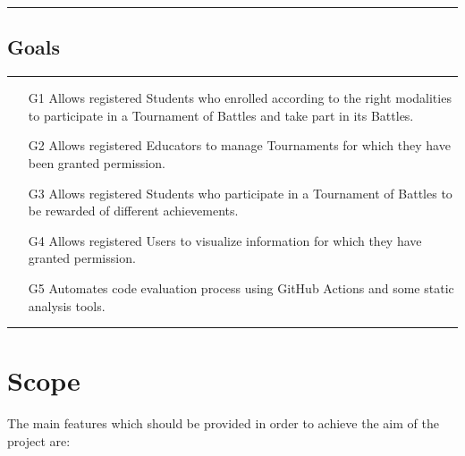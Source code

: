 \documentclass{Configuration_Files/Template}
\begin{document}
{\color{bluepoli}\rule{\linewidth}{0.1pt}}

\subsection{Goals}

{\color{bluepoli}\rule{\linewidth}{0.1pt}}

\begin{enumerate}
    \item[\textcolor{bluepoli}{G1}] Allows registered Students who enrolled according to the right modalities to participate in a Tournament of Battles and take part in its Battles.
    \item[\textcolor{bluepoli}{G2}] Allows registered Educators to manage Tournaments for which they have been granted permission.
    \item[\textcolor{bluepoli}{G3}] Allows registered Students who participate in a Tournament of Battles to be rewarded of different achievements.
    \item[\textcolor{bluepoli}{G4}] Allows registered Users to visualize information for which they have granted permission.
    \item[\textcolor{bluepoli}{G5}] Automates code evaluation process using GitHub Actions and some static analysis tools.
\end{enumerate}

{\color{bluepoli}\rule{\linewidth}{0.1pt}}

\section{Scope}

The main features which should be provided in order to achieve the aim of the project are:
\end{document}

